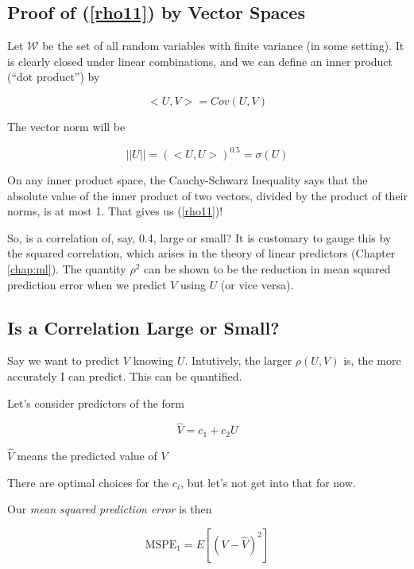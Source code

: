 \subsection{Proof of (\ref{rho11}) by Vector Spaces}

Let $\mathcal{W}$ be the set of all random variables with finite
variance (in some setting).  It is clearly closed under linear
combinations, and we can define an inner product (``dot product'') by

\begin{equation}
<U,V> = Cov(U,V)
\end{equation}

The vector norm will be

\begin{equation}
||U|| = (<U,U>)^{0.5} = \sigma(U)
\end{equation}

On any inner product space, the Cauchy-Schwarz Inequality says that the
absolute value of the inner product of two vectors, divided by the
product of their norms, is at most 1.  That gives us (\ref{rho11})!

So, is a correlation of, say, 0.4, large or small?  It is customary to
gauge this by the squared correlation, which arises in the theory of
linear predictors (Chapter \ref{chap:ml}).  The quantity $\rho^2$ can be
shown to be the reduction in mean squared prediction error when we
predict $V$ using $U$ (or vice versa).

\subsection{Is a Correlation Large or Small?}

Say we want to predict $V$ knowing $U$.  Intutively, the larger
$\rho(U,V)$ is, the more accurately I can predict.  This can be quantified.

Let's consider predictors of the form

\begin{equation}
\label{predv}
\widehat{V} = c_1 + c_2 U
\end{equation}

$\widehat{V}$ means the predicted value of $V$

There are optimal choices for the $c_i$, but let's not get into that for
now.

Our \textit{mean squared prediction error} is then

\begin{equation}
\textrm{MSPE}_1 = E[(V - \widehat{V})^2]
\end{equation}

